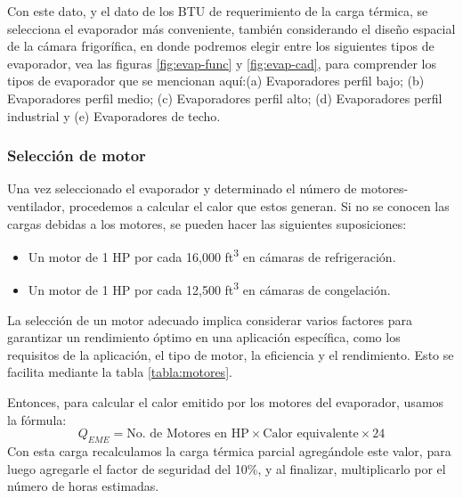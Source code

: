  
 Con este dato, y el dato de los BTU de requerimiento de la carga térmica, se selecciona el evaporador más conveniente, también  considerando el diseño espacial de la cámara frigorífica, en donde podremos elegir  entre los siguientes tipos de evaporador, vea las figuras \ref{fig:evap-func} y \ref{fig:evap-cad}, para comprender los tipos de evaporador que se mencionan aquí:(a) Evaporadores perfil bajo; (b) Evaporadores perfil medio; (c) Evaporadores perfil alto; (d) Evaporadores perfil industrial y (e) Evaporadores de techo.
 
 \subsubsection{Selección de motor}
 
 Una vez seleccionado el evaporador y determinado el número de motores-ventilador, procedemos a calcular el calor que estos generan. Si no se conocen las cargas debidas a los motores, se pueden hacer las siguientes suposiciones:
 \begin{itemize}
 	\item Un motor de 1 HP por cada 16,000 ft\textsuperscript{3} en cámaras de refrigeración.\vspace*{-0.2cm}
 	\item Un motor de 1 HP por cada 12,500 ft\textsuperscript{3} en cámaras de congelación.
 \end{itemize}\vspace*{-0.2cm}
 La selección de un motor adecuado implica considerar varios factores para garantizar un rendimiento óptimo en una aplicación específica, como los requisitos de la aplicación, el tipo de motor, la eficiencia y el rendimiento. Esto se facilita mediante la tabla \ref{tabla:motores}.
 

 
 
 Entonces, para calcular el calor emitido por los motores del evaporador, usamos la fórmula:
 \begin{equation}\label{eq:emision_calor_motores}
 	Q_{EME} = \text{No. de Motores en HP} \times \text{Calor equivalente} \times 24
 \end{equation}
 Con esta carga recalculamos la carga térmica parcial agregándole este valor, para luego agregarle el factor de seguridad del 10\%, y al finalizar, multiplicarlo por el número de horas estimadas.
 
